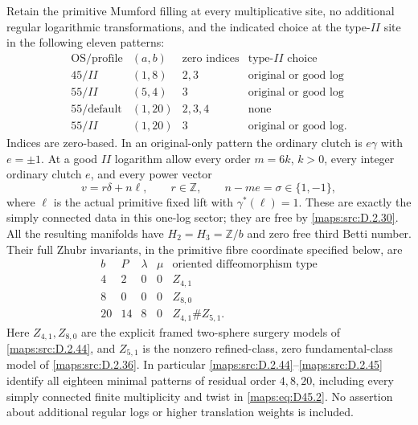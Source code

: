 \begin{theorem}
Retain the primitive Mumford filling at every multiplicative site,
no additional regular logarithmic transformations, and the indicated
choice at the type-$II$ site in the following eleven patterns:
\[
\begin{array}{c|c|c|c}
 \mathrm{OS/profile}&(a,b)&\text{zero indices}&\text{type-}II\text{ choice}\\\hline
 45/II&(1,8)&2,3&\text{original or good log}\\
 55/II&(5,4)&3&\text{original or good log}\\
 55/\mathrm{default}&(1,20)&2,3,4&\text{none}\\
 55/II&(1,20)&3&\text{original or good log}.
\end{array}                                                    \tag{D45.1}\label{maps:eq:D45.1}
\]
Indices are zero-based. In an original-only pattern the ordinary
clutch is $e\gamma$ with $e=\pm1$. At a good $II$ logarithm allow
every order $m=6k$, $k>0$, every integer ordinary clutch $e$, and
every power vector
\[
 v=r\delta+n\ell,\qquad r\in\mathbb Z,
 \qquad n-me=\sigma\in\{1,-1\},                             \tag{D45.2}\label{maps:eq:D45.2}
\]
where $\ell$ is the actual primitive fixed lift with
$\gamma^*(\ell)=1$. These are exactly the simply connected data
in this one-log sector; they are free by \ref{maps:src:D.2.30}.
All the resulting manifolds have $H_2=H_3=\mathbb Z/b$ and
zero free third Betti number. Their full Zhubr invariants, in
the primitive fibre coordinate specified below, are
\[
 \begin{array}{c|c|c|c|c}
 b&P&\lambda&\mu&\text{oriented diffeomorphism type}\\\hline
 4&2&0&0&Z_{4,1}\\
 8&0&0&0&Z_{8,0}\\
 20&14&8&0&Z_{4,1}\#Z_{5,1}.
 \end{array}                                                 \tag{D45.3}\label{maps:eq:D45.3}
\]
Here $Z_{4,1},Z_{8,0}$ are the explicit framed two-sphere surgery
models of \ref{maps:src:D.2.44}, and $Z_{5,1}$ is the nonzero refined-class,
zero fundamental-class model of \ref{maps:src:D.2.36}. In particular \ref{maps:src:D.2.44}--\ref{maps:src:D.2.45}
identify all eighteen minimal patterns of residual order
$4,8,20$, including every simply connected finite multiplicity
and twist in \eqref{maps:eq:D45.2}. No assertion about additional regular
logs or higher translation weights is included.

\end{theorem}
